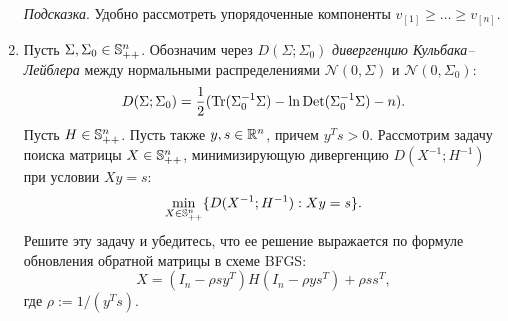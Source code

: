 \documentclass{article}
\begin{document}
\begin{enumerate}[label=\textbf{\arabic*}, leftmargin=0em]
\emph{Подсказка}. Удобно рассмотреть упорядоченные компоненты $v_{[1]} \geq \dots \geq v_{[n]}$.

\item Пусть $\Sigma, \Sigma_0 \in \S^n_{++}$. Обозначим через $D(\Sigma; \Sigma_0)$ \emph{дивергенцию Кульбака--Лейблера} между нормальными распределениями $\mathcal{N}(0, \Sigma)$ и $\mathcal{N}(0, \Sigma_0)$:
\begin{equation}
D(\Sigma; \Sigma_0) = \frac{1}{2} ( \Tr(\Sigma_0^{-1} \Sigma) - \ln \Det(\Sigma_0^{-1} \Sigma) - n ).
\end{equation}
Пусть $H \in \S^n_{++}$. Пусть также $y, s \in \R^n$, причем $y^T s > 0$. Рассмотрим задачу поиска матрицы $X \in \S^n_{++}$, минимизирующую дивергенцию $D(X^{-1}; H^{-1})$ при условии $X y = s$:
\begin{equation}
\min_{X \in \S^n_{++}} \{ D(X^{-1}; H^{-1}) : X y = s \}.
\end{equation}
Решите эту задачу и убедитесь, что ее решение выражается по формуле обновления обратной матрицы в схеме BFGS:
\begin{equation}
X = (I_n - \rho s y^T) H (I_n - \rho y s^T) + \rho s s^T,
\end{equation}
где $\rho := 1/(y^T s)$.

\end{enumerate}
\end{document}
